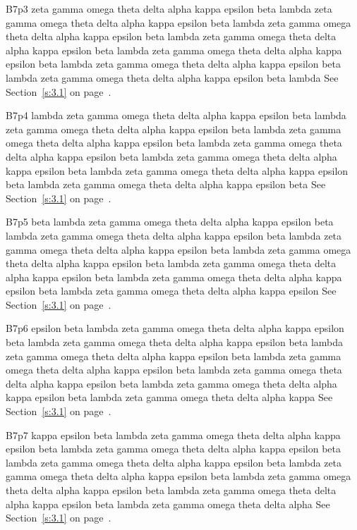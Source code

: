 B7p3 zeta gamma omega theta delta alpha kappa epsilon beta lambda zeta gamma omega theta delta alpha kappa epsilon beta lambda zeta gamma omega theta delta alpha kappa epsilon beta lambda zeta gamma omega theta delta alpha kappa epsilon beta lambda zeta gamma omega theta delta alpha kappa epsilon beta lambda zeta gamma omega theta delta alpha kappa epsilon beta lambda zeta gamma omega theta delta alpha kappa epsilon beta lambda See Section~\ref{s:3.1} on page~\pageref{s:3.1}.

B7p4 lambda zeta gamma omega theta delta alpha kappa epsilon beta lambda zeta gamma omega theta delta alpha kappa epsilon beta lambda zeta gamma omega theta delta alpha kappa epsilon beta lambda zeta gamma omega theta delta alpha kappa epsilon beta lambda zeta gamma omega theta delta alpha kappa epsilon beta lambda zeta gamma omega theta delta alpha kappa epsilon beta lambda zeta gamma omega theta delta alpha kappa epsilon beta See Section~\ref{s:3.1} on page~\pageref{s:3.1}.

B7p5 beta lambda zeta gamma omega theta delta alpha kappa epsilon beta lambda zeta gamma omega theta delta alpha kappa epsilon beta lambda zeta gamma omega theta delta alpha kappa epsilon beta lambda zeta gamma omega theta delta alpha kappa epsilon beta lambda zeta gamma omega theta delta alpha kappa epsilon beta lambda zeta gamma omega theta delta alpha kappa epsilon beta lambda zeta gamma omega theta delta alpha kappa epsilon See Section~\ref{s:3.1} on page~\pageref{s:3.1}.

B7p6 epsilon beta lambda zeta gamma omega theta delta alpha kappa epsilon beta lambda zeta gamma omega theta delta alpha kappa epsilon beta lambda zeta gamma omega theta delta alpha kappa epsilon beta lambda zeta gamma omega theta delta alpha kappa epsilon beta lambda zeta gamma omega theta delta alpha kappa epsilon beta lambda zeta gamma omega theta delta alpha kappa epsilon beta lambda zeta gamma omega theta delta alpha kappa See Section~\ref{s:3.1} on page~\pageref{s:3.1}.

B7p7 kappa epsilon beta lambda zeta gamma omega theta delta alpha kappa epsilon beta lambda zeta gamma omega theta delta alpha kappa epsilon beta lambda zeta gamma omega theta delta alpha kappa epsilon beta lambda zeta gamma omega theta delta alpha kappa epsilon beta lambda zeta gamma omega theta delta alpha kappa epsilon beta lambda zeta gamma omega theta delta alpha kappa epsilon beta lambda zeta gamma omega theta delta alpha See Section~\ref{s:3.1} on page~\pageref{s:3.1}.

